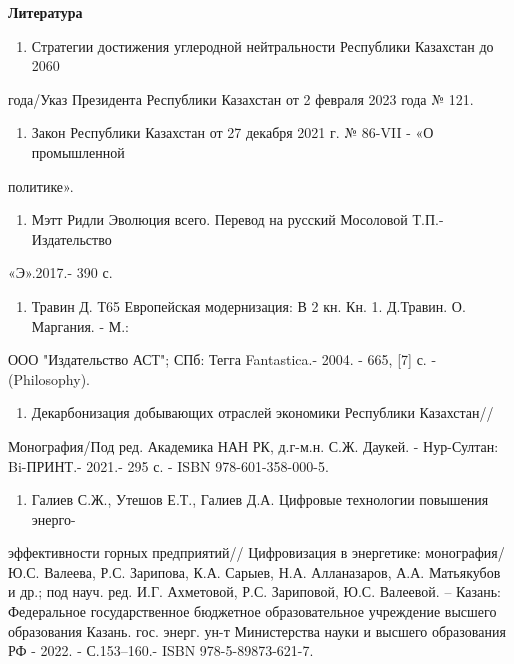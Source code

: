 {\bfseries Литература}

\begin{enumerate}
\def\labelenumi{\arabic{enumi}.}
\item
  Стратегии достижения углеродной нейтральности Республики Казахстан до
  2060
\end{enumerate}

года/Указ Президента Республики Казахстан от 2 февраля 2023 года № 121.

\begin{enumerate}
\def\labelenumi{\arabic{enumi}.}
\setcounter{enumi}{1}
\item
  Закон Республики Казахстан от 27 декабря 2021 г. № 86-VII - «О
  промышленной
\end{enumerate}

политике».

\begin{enumerate}
\def\labelenumi{\arabic{enumi}.}
\setcounter{enumi}{2}
\item
  Мэтт Ридли Эволюция всего. Перевод на русский Мосоловой Т.П.-
  Издательство
\end{enumerate}

«Э».2017.- 390 с.

\begin{enumerate}
\def\labelenumi{\arabic{enumi}.}
\setcounter{enumi}{3}
\item
  Травин Д. Т65 Европейская модернизация: В 2 кн. Кн. 1. Д.Травин. О.
  Маргания. - М.:
\end{enumerate}

ООО "Издательство АСТ"; СПб: Тегга Fantastica.- 2004. - 665, {[}7{]} с.
- (Philosophy).

\begin{enumerate}
\def\labelenumi{\arabic{enumi}.}
\setcounter{enumi}{4}
\item
  Декарбонизация добывающих отраслей экономики Республики Казахстан//
\end{enumerate}

Монография/Под ред. Академика НАН РК, д.г-м.н. С.Ж. Даукей. -
Нур-Султан: Bi-ПРИНТ.- 2021.- 295 с. - ISBN 978-601-358-000-5.

\begin{enumerate}
\def\labelenumi{\arabic{enumi}.}
\setcounter{enumi}{5}
\item
  Галиев С.Ж., Утешов Е.Т., Галиев Д.А. Цифровые технологии повышения
  энерго-
\end{enumerate}

эффективности горных предприятий// Цифровизация в энергетике:
монография/ Ю.С. Валеева, Р.С. Зарипова, К.А. Сарыев, Н.А. Алланазаров,
А.А. Матьякубов и др.; под науч. ред. И.Г. Ахметовой, Р.С. Зариповой,
Ю.С. Валеевой. -- Казань: Федеральное государственное бюджетное
образовательное учреждение высшего образования Казань. гос. энерг. ун-т
Министерства науки и высшего образования РФ - 2022. - С.153--160.- ISBN
978-5-89873-621-7.

